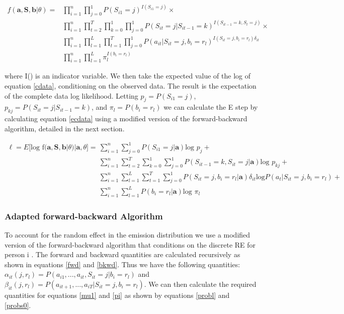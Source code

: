 \documentclass{article}
\begin{document}
\begin{equation}\label{cdata}
\begin{split}
    f(\textbf{a},\textbf{S}, \textbf{b} | \theta)  = & \prod_{i=1}^n \prod_{j=0}^1 
        P(S_{i1}=j)^{I(S_{i1}=j)} \times \\
    & \prod_{i=1}^n \prod^T_{t=2} \prod_{k=0}^1 \prod_{j=0}^1  
        P(S_{it}=j|S_{it-1}=k)^{I(S_{it-1}=k,S_{t}=j)} \times \\ 
    & \prod_{i=1}^n\prod_{l=1}^L \prod^T_{t=1}\prod_{j=0}^1 
        P(a_{it}|S_{it}=j,b_i=r_l)^{I(S_{it}=j,b_i=r_l)\delta_{it}}\\
    & \prod_{i=1}^n\prod_{l=1}^L \pi_l^{I(b_i=r_l)}
\end{split}
\end{equation}

where I() is an indicator variable. We then take the expected 
value of the log of equation \ref{cdata}, conditioning on the 
observed data. The result is the expectation of the complete data 
log likelihood. Letting $p_j = P(S_{i1}=j)$, $p_{kj} = P(S_{it}=j|S_{it-1}=k)$, 
and $\pi_l = P(b_i=r_l)$ we can calculate the E step by calculating 
equation \ref{ecdata} using a modified version of the forward-backward
 algorithm, detailed in the next section.

\begin{equation}\label{ecdata}
\begin{split}
    \ell = E\big[\text{log f}(\textbf{a},\textbf{S}, \textbf{b} | \theta) | \textbf{a},\theta\big]  = 
        & \sum_{i=1}^n\sum_{j=0}^1P(S_{i1}=j|\textbf{a})\text{log }p_j + \\
    & \sum_{i=1}^n \sum^T_{t=2} \sum_{k=0}^1 \sum_{j=0}^1 
        P(S_{it-1}=k,S_{it}=j|\textbf{a})\text{log }p_{kj} + \\ 
    & \sum_{i=1}^n \sum_{l=1}^L \sum^T_{t=1}\sum_{j=0}^1 
        P(S_{it}=j,b_i=r_l|\textbf{a}) \delta_{it}\text{log}P(a_{t}|S_{it}=j, b_i=r_l) + \\
    &  \sum_{i=1}^n \sum_{l=1}^L P(b_i=r_l|\textbf{a}) \text{log }\pi_l 
\end{split}
\end{equation}

\subsubsection{Adapted forward-backward Algorithm}
To account for the random effect in the emission distribution 
we use a modified version of the forward-backward algorithm 
that conditions on the discrete RE for person i \cite{Maruotti2011}. 
The forward and backward quantities are calculated recursively as shown 
in equations \ref{fwd} and \ref{bkwd}. Thus we have the following quantities: 
$\alpha_{it}(j,r_l) = P(a_{i1}, ..., a_{it}, S_{it} = j | b_i=r_l)$ and 
$\beta_{it}(j,r_l) =  P(a_{it+1}, ..., a_{iT} | S_{it} = j,b_i=r_l)$. 
We can then calculate the required quantities for equations \ref{mu1} 
and \ref{pi} as shown by equations \ref{probl} and \ref{probs0}.
 
\end{document}
